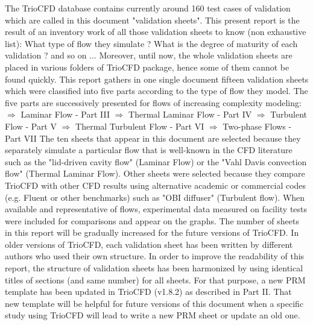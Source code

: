 The TrioCFD database contains currently around 160 test cases of validation which are called in this document "validation sheets".
This present report is the result of an inventory work of all those validation sheets to know (non exhaustive list): What type of flow they simulate ? What is the degree of maturity of each validation ? and so on ... \smallskip\newline
Moreover, until now, the whole validation sheets are placed in various folders of TrioCFD package, hence some of them cannot be found quickly. This report gathers in one single document fifteen validation sheets which were classified into five parts according to the type of flow they model.\smallskip\newline
The five parts are successively presented for flows of increasing complexity modeling:\smallskip \newline
$\Rightarrow$ Laminar Flow - Part III\smallskip \newline
$\Rightarrow$ Thermal Laminar Flow - Part IV\smallskip\newline
$\Rightarrow$ Turbulent Flow - Part V\smallskip\newline
$\Rightarrow$ Thermal Turbulent Flow - Part VI\smallskip\newline
$\Rightarrow$ Two-phase Flows - Part VII\smallskip \newline
The ten sheets that appear in this document are selected because they separately simulate a particular flow that is well-known in the CFD literature such as the "lid-driven cavity flow" (Laminar Flow) or the "Vahl Davis convection flow" (Thermal Laminar Flow). Other sheets were selected because they compare TrioCFD with other CFD results using alternative academic or commercial codes (e.g. Fluent or other benchmarks) such as "OBI diffuser" (Turbulent flow). When available and representative of flows, experimental data measured on facility tests were included for comparisons and appear on the graphs. The number of sheets in this report will be gradually increased for the future versions of TrioCFD.\smallskip\newline
In older versions of TrioCFD, each validation sheet has been written by different authors who used their own structure. In order to improve the readability of this report, the structure of validation sheets has been harmonized by using identical titles of sections (and same number) for all sheets. For that purpose, a new PRM template has been updated in TrioCFD (v1.8.2) as described in Part II. That new template will be helpful for future versions of this document when a specific study using TrioCFD will lead to write a new PRM sheet or update an old one. \newline

